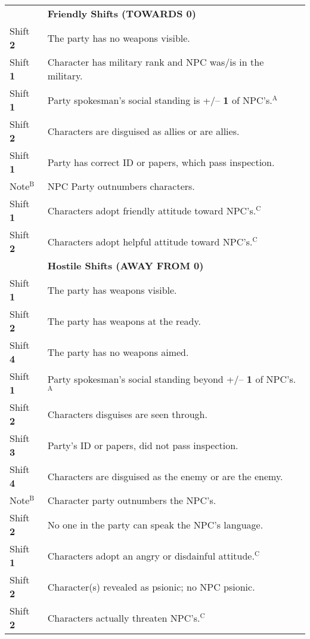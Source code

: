 \begin{table}[htbp]
{\begin{minipage}{0.75\textwidth}
      \begin{tabular}{ll}
        & \textbf{Friendly Shifts (TOWARDS 0)}\\
        \rowcolor{grey}
        Shift \textbf{2} & The party has no weapons visible.\\
        Shift \textbf{1} & Character has military rank and NPC was/is
        in the military.\\ 
        \rowcolor{grey}
        Shift \textbf{1} & Party spokesman's social standing is
        +/-- \textbf{1} of NPC's.$^\mathrm{A}$\\ 
        Shift \textbf{2} & Characters are disguised as allies or are allies.\\
        \rowcolor{grey}
        Shift \textbf{1} & Party has correct ID or papers, which pass
        inspection.\\ 
        Note$^\mathrm{B}$ & NPC Party outnumbers characters.\\
        \rowcolor{grey}
        Shift \textbf{1} & Characters adopt friendly attitude toward
        NPC's.$^\mathrm{C}$\\ 
        Shift \textbf{2} & Characters adopt helpful attitude toward
        NPC's.$^\mathrm{C}$\\ 
        & \textbf{Hostile Shifts (AWAY FROM 0)}\\
        \rowcolor{grey}
        Shift \textbf{1} & The party has weapons visible.\\
        Shift \textbf{2} & The party has weapons at the ready.\\
        \rowcolor{grey}
        Shift \textbf{4} & The party has no weapons aimed.\\
        Shift \textbf{1} & Party spokesman's social standing beyond
        +/-- \textbf{1} of NPC's.$^\mathrm{A}$\\ 
        \rowcolor{grey}
        Shift \textbf{2} & Characters disguises are seen through.\\
        Shift \textbf{3} & Party's ID or papers, did not pass inspection.\\
        \rowcolor{grey}
        Shift \textbf{4} & Characters are disguised as the enemy or
        are the enemy.\\ 
        Note$^\mathrm{B}$ & Character party outnumbers the NPC's.\\
        \rowcolor{grey}
        Shift \textbf{2} & No one in the party can speak the NPC's language.\\
        Shift \textbf{1} & Characters adopt an angry or disdainful
        attitude.$^\mathrm{C}$\\ 
        \rowcolor{grey}
        Shift \textbf{2} & Character(s) revealed as psionic; no NPC psionic.\\
        Shift \textbf{2} & Characters actually threaten NPC's.$^\mathrm{C}$\\
      \end{tabular}
      

\end{minipage}}
\end{table}
